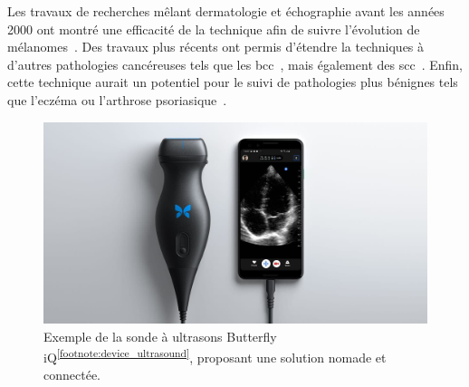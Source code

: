Les travaux de recherches mêlant dermatologie et échographie avant les années 2000 ont montré une efficacité de la technique afin de suivre l'évolution de mélanomes~\cite{Cammarota1998}. Des travaux plus récents ont permis d'étendre la techniques à d'autres pathologies cancéreuses tels que les \gls{bcc}~\cite{Barcaui2014}, mais également des \gls{scc}~\cite{Catalano2010}. Enfin, cette technique aurait un potentiel pour le suivi de pathologies plus bénignes tels que l'eczéma ou l'arthrose psoriasique~\cite{Bhatta2018}.\par

\begin{figure}[H]
    \centering
    \includegraphics[width=\linewidth]{contents/chapter_2/resources/exemple_ultrasound.jpg}
    \caption{Exemple de la sonde à ultrasons Butterfly iQ\textsuperscript{\ref{footnote:device_ultrasound}}, proposant une solution nomade et connectée.}
    \label{fig:exemple_ultrasound}
\end{figure}\par


\addtocounter{footnote}{1}
